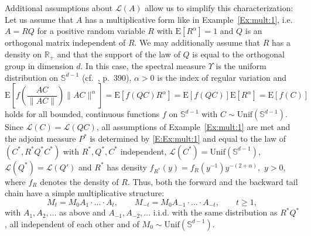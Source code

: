 \documentclass{aptpubarxiv}
\numberwithin{equation}{section}
\begin{document}
\begin{ex}
Additional assumptions about $\mathcal{L}(A)$ allow us to simplify this characterization: Let us assume that $A$ has a multiplicative form like in Example~\ref{Ex:mult:1}, i.e.\ $A=RQ$ for a positive random variable $R$ with ${\mathrm{E}}[R^\alpha]=1$ and $Q$ is an orthogonal matrix independent of $R$. We may additionally assume that $R$ has a density on $\mathbb{R}_+$ and that the support of the law of $Q$ is equal to the orthogonal group in dimension $d$. In this case, the spectral measure $\Upsilon$ is the uniform distribution on $\mathbb{S}^{d-1}$ (cf.\ \cite{Bura09}, p.\ 390), $\alpha>0$ is the index of regular variation and
 $${\mathrm{E}}\left[f\left(\frac{AC}{\| AC\|} \right)\|AC\|^\alpha \right]={\mathrm{E}}\left[f\left(QC \right)R^\alpha \right]={\mathrm{E}}\left[f\left(QC \right)\right]{\mathrm{E}}[R^\alpha]={\mathrm{E}}[f(C)]$$ 
holds for all bounded, continuous functions $f$ on $\mathbb{S}^{d-1}$ with $C \sim \mbox{Unif}(\mathbb{S}^{d-1})$. Since $\mathcal{L}(C)=\mathcal{L}(QC)$, all assumptions of Example~\ref{Ex:mult:1} are met and the adjoint measure $P^\ast$ is determined by \eqref{E:Ex:mult:1} and equal to the law of $(C^\ast ,R^\ast Q^\ast C^\ast)$ with $R^\ast, Q^\ast, C^\ast$ independent, $\mathcal{L}(C^\ast)=\mbox{Unif}(\mathbb{S}^{d-1})$, $\mathcal{L}(Q^\ast)=\mathcal{L}(Q')$ and $R^\ast$ has density $f_{R^\ast}(y)=f_R(y^{-1})y^{-(2+\alpha)},$ $y>0$, where $f_R$ denotes the density of $R$. Thus, both the forward and the backward tail chain have a simple multiplicative structure:
\[ 
  M_t=M_0A_1 \cdot \ldots \cdot A_t, \qquad 
  M_{-t}=M_0A_{-1}\cdot \ldots \cdot A_{-t}, 
  \qquad t\geq 1, 
\]
with $A_1, A_2, \ldots$ as above and $A_{-1}, A_{-2}, \ldots$ i.i.d. with the same distribution as $R^\ast Q^\ast $, all independent of each other and of $M_0\sim\mbox{Unif}(\mathbb{S}^{d-1})$.
\end{ex}
\end{document}
